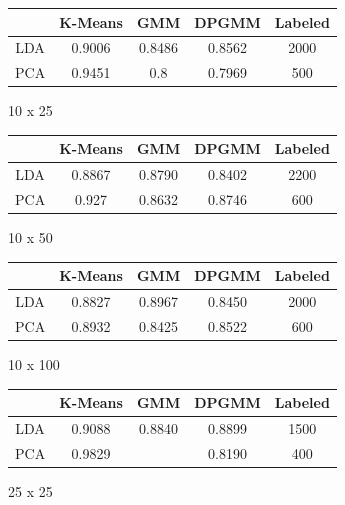 \documentclass[11pt,a4paper]{article}
\begin{document}
	\begin{figure}
	\begin{center}
	\begin{tabular}{|c|c|c|c|c|}
		\hline
		 & K-Means & GMM & DPGMM & Labeled \\
		 \hline
		 LDA & 0.9006 & 0.8486 & 0.8562 & 2000 \\
		 \hline
		 PCA & 0.9451 & 0.8 & 0.7969 & 500 \\
		 \hline
	\end{tabular}
	\caption{10 x 25}
	\end{center}
	\end{figure}





	\begin{figure}
	\begin{center}
	\begin{tabular}{|c|c|c|c|c|}
		\hline
		 & K-Means & GMM & DPGMM & Labeled \\
		 \hline
		 LDA & 0.8867 & 0.8790 & 0.8402 & 2200 \\
		 \hline
		 PCA & 0.927 & 0.8632 & 0.8746 & 600 \\
		 \hline
	\end{tabular}
	\caption{10 x 50}
	\end{center}
	\end{figure}
	
	
	
	\begin{figure}
	\begin{center}
	\begin{tabular}{|c|c|c|c|c|}
		\hline
		 & K-Means & GMM & DPGMM & Labeled \\
		 \hline
		 LDA & 0.8827 & 0.8967 & 0.8450 & 2000 \\
		 \hline
		 PCA & 0.8932 & 0.8425 & 0.8522 & 600 \\
		 \hline
	\end{tabular}
	\caption{10 x 100}
	\end{center}
	\end{figure}
	
	
	
	\begin{figure}
	\begin{center}
	\begin{tabular}{|c|c|c|c|c|}
		\hline
		 & K-Means & GMM & DPGMM & Labeled \\
		 \hline
		 LDA & 0.9088 & 0.8840 & 0.8899 & 1500 \\
		 \hline
		 PCA & 0.9829 & & 0.8190 & 400 \\
		 \hline
	\end{tabular}
	\caption{25 x 25}
	\end{center}
	\end{figure}
	
\end{document}
